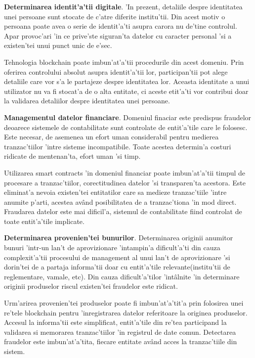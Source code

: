 \documentclass[12pt,a4paper,twoside]{report}
\begin{document}
\textbf{Determinarea identit'a'tii digitale}. 'In prezent, detaliile despre identitatea unei persoane sunt stocate de c'atre diferite institu'tii. Din acest motiv o persoana poate avea o serie de identit'a'ti asupra carora nu de'tine controlul. Apar provoc'ari 'in ce prive'ste siguran'ta datelor cu caracter personal 'si a existen'tei unui punct unic de e'sec. 

Tehnologia blockchain poate imbun'at'a'tii procedurile din acest domeniu. Prin oferirea controlului absolut asupra identit'a'tii lor, participan'tii pot alege detaliile care vor s'a le partajeze despre identitatea lor. Aceasta identitate a unui utilizator nu va fi stocat'a de o alta entitate, ci aceste etit'a'ti vor contribui doar la validarea detaliilor despre identitatea unei persoane.

\textbf{Managementul datelor financiare}. Domeniul finaciar este predispus fraudelor deoarece sistemele de contabilitate sunt controlate de entit'a'tile care le folosesc. Este necesar, de asemenea un efort uman considerabil pentru medierea tranzac'tiilor 'intre sisteme incompatibile. Toate acestea determin'a costuri ridicate de mentenan'ta, efort uman 'si timp.

Utilizarea smart contracts 'in domeniul financiar poate imbun'at'a'tii timpul de procesare a tranzac'tiilor, corectitudinea datelor 'si transparen'ta acestora. Este eliminat'a nevoia existen'tei entitatilor care sa medieze tranzac'tiile 'intre anumite p'arti, acestea av\^and posibilitatea de a tranzac'tiona 'in mod direct. Fraudarea datelor este mai dificil'a, sistemul de contabilitate fiind controlat de toate entit'a'tile implicate. 

\textbf{Determinarea provenien'tei bunurilor}. Determinarea originii anumitor bunuri 'intr-un lan't de aprovizionare 'intampin'a dificult'a'ti din cauza complexit'a'tii procesului de management al unui lan't de aprovizionare 'si dorin'tei de a partaja informa'tii doar cu entit'a'tile relevante(institu'tii de reglementare, vamale, etc). Din cauza dificult'a'tilor 'int\^alnite 'in determinare originii produselor riscul existen'tei fraudelor este ridicat.

Urm'arirea provenien'tei produselor poate fi imbun'at'a'tit'a prin folosirea unei re'tele blockchain pentru 'inregistrarea datelor referitoare la originea produselor. Accesul la informa'tii este simplificat, entit'a'tile din re'tea participand la validarea si memorarea tranzac'tiilor 'in registrul de date comun. Detectarea fraudelor este imbun'at'a'tita, fiecare entitate av\^and acces la tranzac'tiile din sistem. 
\end{document}

